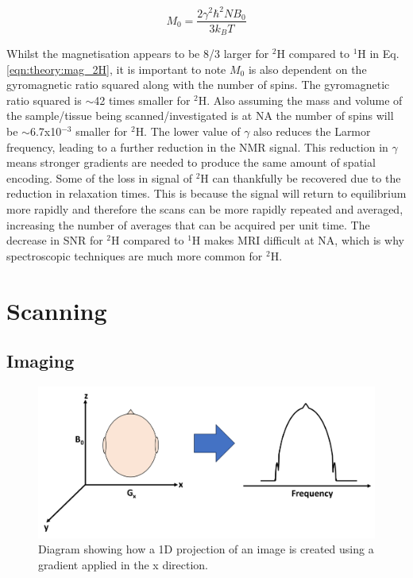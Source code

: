 \begin{equation}
    M_0 = \frac{2\gamma^2 \hbar^2 N B_0}{3k_BT}
    \label{eqn:theory:mag_2H}
\end{equation}

Whilst the magnetisation appears to be 8/3 larger for $^2$H compared to $^1$H in Eq. \ref{eqn:theory:mag_2H}, it is important to note $M_0$ is also dependent on the gyromagnetic ratio squared along with the number of spins. The gyromagnetic ratio squared is $\sim$42 times smaller for $^2$H. Also assuming the mass and volume of the sample/tissue being scanned/investigated is at \ac{NA} the number of spins will be $\sim$6.7x10$^{-3}$ smaller for $^2$H. The lower value of $\gamma$ also reduces the Larmor frequency, leading to a further reduction in the NMR signal. This reduction in $\gamma$ means stronger gradients are needed to produce the same amount of spatial encoding. Some of the loss in signal of $^2$H can thankfully be recovered due to the reduction in relaxation times. This is because the signal will return to equilibrium more rapidly and therefore the scans can be more rapidly repeated and averaged, increasing the number of averages that can be acquired per unit time. The decrease in \ac{SNR} for $^2$H compared to $^1$H makes \ac{MRI} difficult at \ac{NA}, which is why spectroscopic techniques are much more common for $^2$H. 


\section{Scanning}   

\subsection{Imaging}
\label{Chap:Theory:Imaging}

\begin{figure}
    \centering
    \includegraphics[width=1\textwidth]{Figures/Theory/1D_Projection.png}
    \caption{Diagram showing how a 1D projection of an image is created using a gradient applied in the x direction.}
    \label{fig:theory:1D}
\end{figure}

